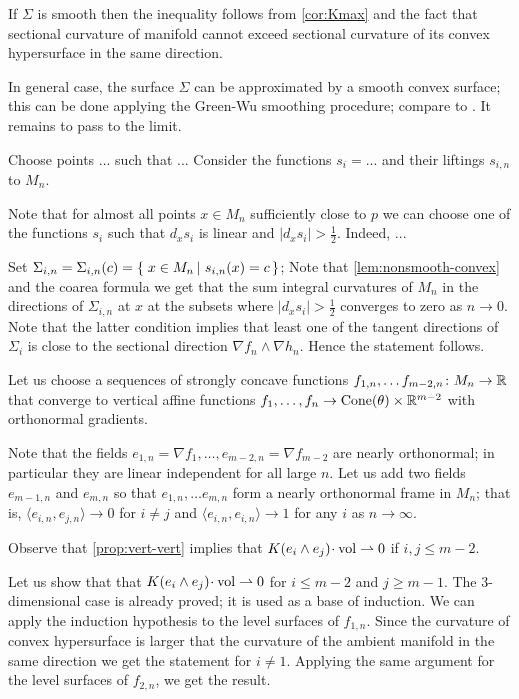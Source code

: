  If $\Sigma$ is smooth then the inequality follows from \ref{cor:Kmax} and the fact that sectional curvature of manifold cannot exceed sectional curvature of its convex hypersurface in the same direction.

In general case, the surface $\Sigma$ can be approximated by a smooth convex surface;
this can be done applying the Green-Wu smoothing procedure; compare to \cite{AKP-buyalo}.
It remains to pass to the limit.
\qeds

Choose points ... such that ...
Consider the functions $s_i=...$ and their liftings $s_{i,n}$ to $M_n$.

Note that for almost all points $x\in M_n$ sufficiently close to $p$ 
we can choose one of the functions $s_i$ such that $d_xs_i$ is linear and $|d_xs_i|>\tfrac12$.
Indeed, ...

Set $\Sigma_{i,n}=\Sigma_{i,n}(c)=\set{x\in M_n}{s_{i,n}(x)=c}$;
Note that \ref{lem:nonsmooth-convex} and the coarea formula we get that the sum integral curvatures of $M_n$ in the directions of $\Sigma_{i,n}$ at $x$ at the subsets where $|d_xs_i|>\tfrac12$ converges to zero as $n\to 0$.
Note that the latter condition implies that least one of the tangent directions of $\Sigma_i$ is close to the sectional direction $\nabla f_n\wedge\nabla h_n$.
Hence the statement follows.
\qeds


Let us choose a sequences of strongly concave functions $f_{1,n},\dots f_{m-2,n}\colon M_n\to \mathbb{R}$ that converge to vertical affine functions $f_1,\dots,f_n\to \operatorname{Cone}(\theta)\times \mathbb{R}^{m-2}$ with orthonormal gradients.

Note that the fields $e_{1,n}=\nabla f_1,\dots,e_{m-2,n}=\nabla f_{m-2}$ are nearly orthonormal;
in particular they are linear independent for all large $n$.
Let us add two fields $e_{m-1,n}$ and $e_{m,n}$  so that $e_{1,n},\dots e_{m,n}$ form a nearly orthonormal frame in $M_n$;
that is, $\langle e_{i,n}, e_{j,n}\rangle\to 0$ for $i\ne j$ and $\langle e_{i,n}, e_{i,n}\rangle\to 1$ for any $i$ as $n\to\infty$.

Observe that \ref{prop:vert-vert} implies that $K(e_i\wedge e_j)\cdot\vol\rightharpoonup 0$ if $i,j\le m-2$.

Let us show that that $K(e_i\wedge e_j)\cdot\vol\rightharpoonup 0$ for $i\le m-2$ and $j\ge m-1$.
The $3$-dimensional case is already proved; it is used as a base of induction.
We can apply the induction hypothesis to the level surfaces of $f_{1,n}$.
Since the curvature of convex hypersurface is larger that the curvature of the ambient manifold in the same direction we get the statement for $i\ne 1$.
Applying the same argument for the level surfaces of $f_{2,n}$, we get the result.

